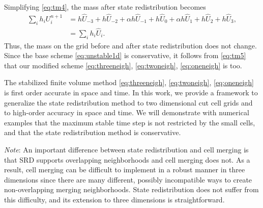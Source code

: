 Simplifying \eqref{eq:tm4}, the mass after state redistribution becomes
\begin{equation}\label{eq:tm5}
\begin{aligned}
\sum_{i} h_i U^{n+1}_i  &= h \widehat{U}_{-3} + h \widehat{U}_{-2} + \alpha h \widehat{U}_{-1} +h \widehat{U}_0+\alpha h \widehat{U}_{1} + h \widehat{U}_{2} + h \widehat{U}_{3},\\
&= \sum_{i} h_i \widehat{U}_i.
\end{aligned}
\end{equation}
Thus, the mass on the grid before and after state redistribution does not change.
Since the base scheme \eqref{eq:unstable1d} is conservative, it follows from
\eqref{eq:tm5} that our modified scheme \eqref{eq:threeneigh},
\eqref{eq:twoneigh}, \eqref{eq:oneneigh} is too.




The stabilized finite volume method \eqref{eq:threeneigh}, \eqref{eq:twoneigh}, \eqref{eq:oneneigh} is first order accurate in space and time.  In this work, we provide a framework to generalize the state redistribution method to two dimensional cut cell grids and to high-order accuracy in space and time.
We will demonstrate with numerical examples that the maximum stable time step is not restricted by the 
small cells, and that the state redistribution method is conservative.




\textit{Note}: An important difference between state redistribution and cell merging is that SRD
supports overlapping neighborhoods and cell merging does not. 
As a result, cell merging can be difficult to implement in a robust manner in three dimensions since there are many different, possibly incompatible ways to create non-overlapping merging neighborhoods.
State redistribution does not suffer from this difficulty, and its extension to three dimensions is straightforward.






